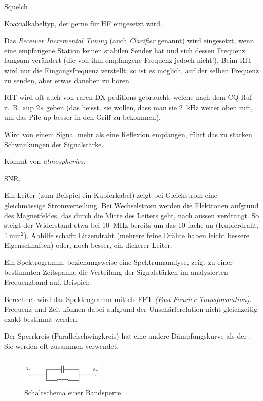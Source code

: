 {}

{Squelch}

{Koaxialkabeltyp, der gerne für HF eingesetzt wird.}

{Das \textit{Receiver Incremental Tuning} (auch \textit{Clarifier} genannt) wird eingesetzt, wenn eine empfangene Station keinen stabilen Sender hat und sich dessen Frequenz langsam verändert (die von ihm empfangene Frequenz jedoch nicht!). Beim RIT wird nur die Eingangsfrequenz verstellt; so ist es möglich, auf der selben Frequenz zu senden, aber etwas daneben zu hören.

RIT wird oft auch von raren DX-peditions gebraucht, welche nach dem CQ-Ruf z. B. «up 2» geben (das heisst, sie wollen, dass man sie 2 kHz weiter oben ruft, um das Pile-up besser in
den Griff zu bekommen).}

{Wird von einem Signal mehr als eine Reflexion empfangen, führt das zu starken Schwankungen der Signalstärke.}

{Kommt von \textit{atmospherics}. }

{SNR. }

{Ein Leiter (zum Beispiel ein Kupferkabel) zeigt bei Gleichstrom eine gleichmässige Stromverteilung. Bei Wechselstrom werden die Elektronen aufgrund des Magnetfeldes, das durch die Mitte des Leiters geht, nach aussen verdrängt. So steigt der Widerstand etwa bei 10 MHz bereits um das 10-fache an (Kupferdraht, $1~\mathrm{mm}^2$). Abhilfe schafft Litzendraht (mehrere feine Drähte haben leicht bessere Eigenschhaften) oder, noch besser, ein dickerer Leiter.}

{}

{Ein Spektrogramm, beziehungsweise eine Spektrumanalyse, zeigt zu einer bestimmten Zeitspanne die Verteilung der Signalstärken im analysierten Frequenzband auf. Beispiel: 

Berechnet wird das Spektrogramm mittels FFT \textit{(Fast Fourier Transformation)}. Frequenz und Zeit können dabei aufgrund der Unschärferelation nicht gleichzeitig exakt bestimmt werden.}

{Der Sperrkreis (Parallelschwingkreis) hat eine andere Dämpfungskurve als der . Sie werden oft zusammen verwendet.

\begin{figure}[h!]
 \centering
 \includegraphics[width=4cm]{./png/Amfu-Schema_Sperrkreis.png}
 \caption{Schaltschema einer Bandsperre}
 \label{fig:sperrkreis}
\end{figure}

}

